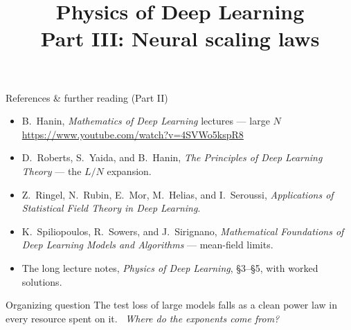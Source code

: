 \documentclass[11pt]{beamer}
\begin{document}
\begin{frame}{References \& further reading (Part II)}
  \small
  \begin{itemize}
    \item B.~Hanin, \emph{Mathematics of Deep Learning} lectures --- large $N$\\
      {\footnotesize \url{https://www.youtube.com/watch?v=4SVWo5kspR8}}
    \item D.~Roberts, S.~Yaida, and B.~Hanin, \emph{The Principles of
      Deep Learning Theory} --- the $L/N$ expansion.
    \item Z.~Ringel, N.~Rubin, E.~Mor, M.~Helias, and I.~Seroussi,
      \emph{Applications of Statistical Field Theory in Deep Learning}.
    \item K.~Spiliopoulos, R.~Sowers, and J.~Sirignano,
      \emph{Mathematical Foundations of Deep Learning Models and
      Algorithms} --- mean-field limits.
    \item The long lecture notes, \emph{Physics of Deep Learning},
      \S3--\S5, with worked solutions.
  \end{itemize}
\end{frame}

\title{Physics of Deep Learning\\[2pt]
\large Part III: Neural scaling laws}
\begin{frame}
  \titlepage
  \vspace{-2mm}
  \begin{block}{Organizing question}
    The test loss of large models falls as a clean power law in every
    resource spent on it. \ \emph{Where do the exponents come
    from?}
  \end{block}
\end{frame}
\end{document}
